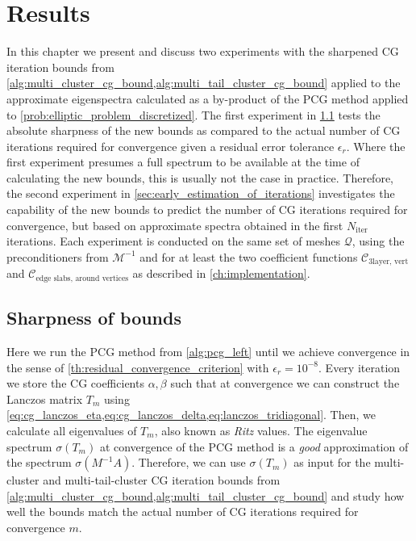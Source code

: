 \chapter{Results}\label{ch:results}
In this chapter we present and discuss two experiments with the sharpened CG iteration bounds from \cref{alg:multi_cluster_cg_bound,alg:multi_tail_cluster_cg_bound} applied to the approximate eigenspectra calculated as a by-product of the PCG method applied to \cref{prob:elliptic_problem_discretized}. The first experiment in \cref{sec:sharpness_of_bounds} tests the absolute sharpness of the new bounds as compared to the actual number of CG iterations required for convergence given a residual error tolerance $\epsilon_r$. Where the first experiment presumes a full spectrum to be available at the time of calculating the new bounds, this is usually not the case in practice. Therefore, the second experiment in \cref{sec:early_estimation_of_iterations} investigates the capability of the new bounds to predict the number of CG iterations required for convergence, but based on approximate spectra obtained in the first $N_{\text{iter}}$ iterations. Each experiment is conducted on the same set of meshes $\mathcal{Q}$, using the preconditioners from $\mathcal{M}^{-1}$ and for at least the two coefficient functions $\mathcal{C}_{\text{3layer, vert}}$ and $\mathcal{C}_{\text{edge slabs, around vertices}}$ as described in \cref{ch:implementation}.

\section{Sharpness of bounds}\label{sec:sharpness_of_bounds}
Here we run the PCG method from \cref{alg:pcg_left} until we achieve convergence in the sense of \cref{th:residual_convergence_criterion} with $\epsilon_r=10^{-8}$. Every iteration we store the CG coefficients $\alpha,\beta$ such that at convergence we can construct the Lanczos matrix $T_m$ using \cref{eq:cg_lanczos_eta,eq:cg_lanczos_delta,eq:lanczos_tridiagonal}. Then, we calculate all eigenvalues of $T_m$, also known as \textit{Ritz} values. The eigenvalue spectrum $\sigma(T_m)$ at convergence of the PCG method is a \textit{good} approximation of the spectrum $\sigma(M^{-1}A)$. Therefore, we can use $\sigma(T_m)$ as input for the multi-cluster and multi-tail-cluster CG iteration bounds from \cref{alg:multi_cluster_cg_bound,alg:multi_tail_cluster_cg_bound} and study how well the bounds match the actual number of CG iterations required for convergence $m$.


